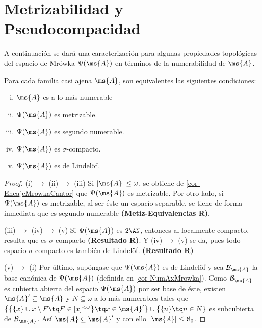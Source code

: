 	\section{Metrizabilidad y Pseudocompacidad}
	
	A continuación se dará una caracterización para algunas propiedades topológicas del espacio de Mrówka $\Psi(\ms{A})$ en términos de la numerabilidad de $\ms{A}$. %
	
	\begin{proposicion}\label{prop-tra-numerable}
		Para cada familia casi ajena $\ms{A}$, son equivalentes las siguientes condiciones:
		\begin{enumerate}[i)]
			\item $\ms{A}$ es a lo más numerable
			\item $\Psi(\ms{A})$ es metrizable.
			\item $\Psi(\ms{A})$ es segundo numerable.
			\item $\Psi(\ms{A})$ es $\sigma$-compacto.
			\item $\Psi(\ms{A})$ es de Lindelöf.
		\end{enumerate}
	\end{proposicion}
	
	\begin{proof} 
		(i) $\rightarrow$ (ii) $\rightarrow$ (iii) Si $|\ms{A}| \leq \omega$, se obtiene de \ref{cor-EncajeMrowkaCantor} que $\Psi(\ms{A})$ es metrizable. Por otro lado, si $\Psi(\ms{A})$ es metrizable, al ser éste un espacio separable, se tiene de forma inmediata que es segundo numerable \textbf{(Metiz-Equivalencias R)}.
			
		(iii) $\rightarrow$ (iv) $\to$ (v) Si $\Psi(\ms{A})$ es $2\AN$, entonces al localmente compacto, resulta que es $\sigma$-compacto \textbf{(Resultado R)}. Y (iv) $\rightarrow$ (v) se da, pues todo espacio $\sigma$-compacto es también de Lindelöf. \textbf{(Resultado R)}
			
		(v) $\rightarrow$ (i) Por último, supóngase que $\Psi(\ms{A})$ es de Lindelöf y sea $\mathcal{B}_\ms{A}$ la base canónica de $\Psi(\ms{A})$ (definida en \ref{cor-NumAxMrowka}). Como $\mathcal{B}_ \ms{A}$ es cubierta abierta del espacio $\Psi(\ms{A})$ por ser base de éste, existen $\ms{A}' \subseteq \ms{A}$ y $N \subseteq \omega$ a lo más numerables tales que $\big\{ \big\{ \{x\} \cup x \setminus F \tq F \in [x]^{<\omega} \big\} \tq x \in \ms{A}' \big\} \cup \big\{ \{n\} \tq n \in N\}$ es subcubierta de $\mathcal{B}_ \ms{A}$. Así $\ms{A} \subseteq \ms{A}'$ y con ello $|\ms{A}| \leq \aleph_0$.
	\end{proof}
	
